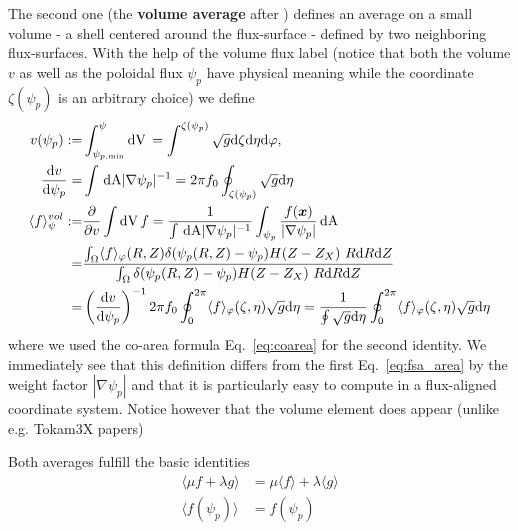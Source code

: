 The second one (the {\bf volume average} after \cite{haeseleer}) defines an average on a
small volume - a shell centered around the flux-surface - defined by two neighboring flux-surfaces.
With the help of the volume
flux label (notice that both the volume $v$ as well as the poloidal flux $\psi_p$ have physical 
meaning while the coordinate $\zeta(\psi_p)$ is an arbitrary choice) we define
\begin{align} \label{eq:fsa_vol}
v(\psi_p) :=& \int_{\psi_{p,\min}}^\psi \mathrm{dV}\, = \int^{\zeta(\psi_p)} \sqrt{g}\mathrm{d}\zeta\mathrm{d}\eta\mathrm{d}\varphi,
\\
\frac{\mathrm{d} v}{\mathrm{d}\psi_p} =& \int\,\mathrm{dA} |\nabla\psi_p|^{-1} = 2\pi f_0\oint_{\zeta(\psi_p)} \sqrt{g}\mathrm{d}\eta \\
\langle f \rangle^{vol}_\psi :=& \frac{\partial}{\partial v} \int \mathrm{dV}\, f
 = \frac{1}{\int \,\mathrm{dA} |\nabla\psi_p|^{-1} } \int_{\psi_p} \frac{f({\boldsymbol{x}})}{|\nabla\psi_p|} \,\mathrm{dA} \nonumber\\
=& \frac{\int_\Omega \langle f\rangle_\varphi(R,Z) \delta(\psi_p(R,Z)-\psi_{p})H(Z-Z_X)\ R \mathrm{d} R \mathrm{d} Z}
{\int_\Omega \delta(\psi_p(R,Z)-\psi_{p})H(Z-Z_X)\ R \mathrm{d} R \mathrm{d} Z}\nonumber\\
 =& \left(\frac{\mathrm{d} v}{\mathrm{d}\psi_p }\right)^{-1} 2\pi f_0 \oint_0^{2\pi} \langle f\rangle_\varphi(\zeta,\eta) \sqrt{g}\mathrm{d}\eta
 = \frac{1}{\oint \sqrt{g}\mathrm{d}\eta } \oint_0^{2\pi} \langle f\rangle_\varphi(\zeta,\eta) \sqrt{g}\mathrm{d}\eta
\end{align}
where we used the co-area formula Eq.~\eqref{eq:coarea} for the second
identity. We immediately see that this definition differs from the first
Eq.~\eqref{eq:fsa_area} by the weight factor $|\nabla\psi_p|$ and that it is particularly easy to compute
in a flux-aligned coordinate system. Notice however that the volume element does appear (unlike e.g. Tokam3X papers)

Both averages fulfill the basic identities
\begin{align}
\label{eq:fsa_identities}
\langle \mu f + \lambda g\rangle &= \mu\langle f\rangle + \lambda \langle g\rangle \\
\langle f(\psi_p) \rangle &= f(\psi_p)
\end{align}


